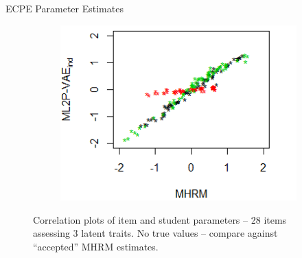 \documentclass{beamer}
\theoremstyle{definition}
\begin{document}
\begin{frame}{ECPE Parameter Estimates}
\begin{figure}[h]
\begin{subfigure}{.32\textwidth}
    \end{subfigure}
    \begin{subfigure}{.32\textwidth}
      \centering
      \includegraphics[width=.9\linewidth]{../img/ml_journal_results/ecpe/vae_ind_theta_ecpe.png}
    \end{subfigure}
    \caption*{\scriptsize Correlation plots of item and student parameters -- 28 items assessing 3 latent traits. No true values -- compare against ``accepted'' MHRM estimates.}
    \label{fig:ecpe_cor}
\end{figure}


\end{frame}
\end{document}

